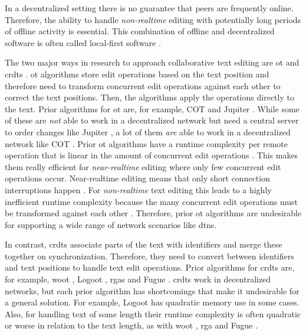 In a decentralized setting there is no guarantee that peers are frequently online. Therefore, the ability to handle \textit{non-realtime} editing with potentially long periods of offline activity is essential. This combination of offline and decentralized software is often called local-first software \cite{2019-kleppmann-local-first}.

The two major ways in research to approach collaborative text editing are \gls{ot} and \glspl{crdt} \cite[page 2]{2019-sun-difference-ot-crdt-1-general-transformation-framework}. \gls{ot} algorithms store edit operations based on the text position and therefore need to transform concurrent edit operations against each other to correct the text positions. Then, the algorithms apply the operations directly to the text.
Prior algorithms for \gls{ot} are, for example, COT \cite{2009-sun-ot-context-undo} and Jupiter \cite{1995-nichols-jupiter}. While some of these are \textit{not} able to work in a decentralized network but need a central server to order changes like Jupiter \cite{1995-nichols-jupiter}, a lot of them \textit{are} able to work in a decentralized network like COT \cite{2009-sun-ot-context-undo} \cite[Section 4]{2019-sun-difference-ot-crdt-3-building-real-world-applications}. Prior \gls{ot} algorithms have a runtime complexity per remote operation that is linear in the amount of concurrent edit operations \cite[Section 3.1.4]{2019-sun-difference-ot-crdt-2-correctness-complexity}. This makes them really efficient for \textit{near-realtime} editing where only few concurrent edit operations occur. Near-realtime editing means that only short connection interruptions happen \cite{2016-yata-yjs}. For \textit{non-realtime} text editing this leads to a highly inefficient runtime complexity because the many concurrent edit operations must be transformed against each other \cite[Section 1]{2019-sun-difference-ot-crdt-3-building-real-world-applications}. Therefore, prior \gls{ot} algorithms are undesirable for supporting a wide range of network scenarios like \glspl{dtn}.

In contrast, \glspl{crdt} associate parts of the text with identifiers and merge these together on synchronization. Therefore, they need to convert between identifiers and text positions to handle text edit operations. Prior algorithms for \glspl{crdt} are, for example, \gls{woot} \cite{2006-oster-woot}, Logoot \cite{2009-weiss-logoot}, \glspl{rga} \cite{2011-roh-rga} and Fugue \cite{2023-weidner-minimizing-interleaving}. \glspl{crdt} work in decentralized networks, but each prior algorithm has shortcomings that make it undesirable for a general solution. For example, Logoot \cite{2009-weiss-logoot} has quadratic memory use in some cases. Also, for handling text of some length their runtime complexity is often quadratic or worse in relation to the text length, as with \gls{woot} \cite{2006-oster-woot}, \gls{rga} \cite{2011-roh-rga} and Fugue \cite{2023-weidner-minimizing-interleaving} \cite[Section 5.3]{2019-sun-difference-ot-crdt-1-general-transformation-framework}.

